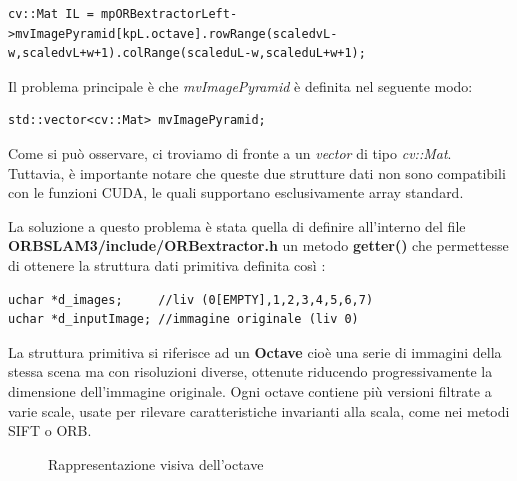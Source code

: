 \documentclass[12pt,a4paper]{report}
\begin{document}
\begin{lstlisting}
cv::Mat IL = mpORBextractorLeft->mvImagePyramid[kpL.octave].rowRange(scaledvL-w,scaledvL+w+1).colRange(scaleduL-w,scaleduL+w+1);
\end{lstlisting}

Il problema principale è che \textit{mvImagePyramid} è definita nel seguente modo:

\begin{lstlisting}
std::vector<cv::Mat> mvImagePyramid;
\end{lstlisting}

Come si può osservare, ci troviamo di fronte a un \textit{vector} di tipo \textit{cv::Mat}. Tuttavia, è importante notare che queste due strutture dati non sono compatibili con le funzioni CUDA, le quali supportano esclusivamente array standard.

La soluzione a questo problema è stata quella di definire all'interno del file \textbf{ORBSLAM3/include/ORBextractor.h} un metodo \textbf{getter()} che permettesse di ottenere la struttura dati primitiva definita così : 

\begin{lstlisting}
uchar *d_images;     //liv (0[EMPTY],1,2,3,4,5,6,7) 
uchar *d_inputImage; //immagine originale (liv 0)
\end{lstlisting}

La struttura primitiva si riferisce ad un \textbf{Octave} cioè una serie di immagini della stessa scena ma con risoluzioni diverse, ottenute riducendo progressivamente la dimensione dell'immagine originale. 
Ogni octave contiene più versioni filtrate a varie scale, usate per rilevare caratteristiche invarianti alla scala, come nei metodi SIFT o ORB.

\begin{figure}[H]
    \centering
    \caption{Rappresentazione visiva dell'octave}
\end{figure}
\end{document}
